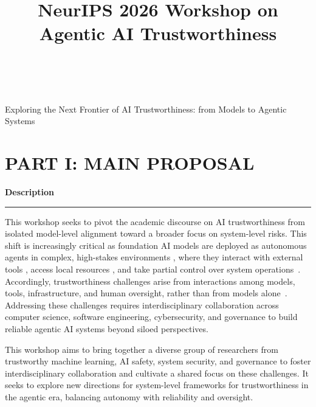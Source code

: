 \documentclass{article}
\title{\large NeurIPS 2026 Workshop on Agentic AI Trustworthiness\\
\large \textit{\mdseries{Sydney, Australia 6-12 December 2026}}\large\normalfont~\raisebox{-0.1em}{[\ding{43}~\href{https://a5507203.github.io/neurips-agentic-ai-workshop/}{\hl{website}}]}}
\author{}
\date{}
\newcommand{\sectiontitle}[1]{\noindent\textbf{\textcolor{neuripsblue}{#1}}\vspace{0.1cm}\hrule\vspace{0.2cm}}
\begin{document}
\maketitle
\vspace{-7em}
\begin{advertisement}
Exploring the Next Frontier of AI Trustworthiness: from Models to Agentic Systems
\end{advertisement}

\section*{\textcolor{neuripsblue}{\large PART I: MAIN PROPOSAL}}
\vspace{-7pt}
\sectiontitle{Description}
\vspace{-2pt}
This workshop seeks to pivot the academic discourse on AI trustworthiness from isolated model-level alignment toward a broader focus on system-level risks. This shift is increasingly critical as foundation AI models are deployed as autonomous agents in complex, high-stakes environments \cite{anthropic_claudecode_2025, openai_codex_system}, where they interact with external tools \cite{schick2023toolformer}, access local resources \cite{yang2024sweagent}, and take partial control over system operations~\cite{li2026les}. Accordingly, trustworthiness challenges arise from interactions among models, tools, infrastructure, and human oversight, rather than from models alone~\cite{deng2024aiagents,kim2026attackdefense}. Addressing these challenges requires interdisciplinary collaboration across computer science, software engineering, cybersecurity, and governance to build reliable agentic AI systems beyond siloed perspectives.


This workshop aims to bring together a diverse group of researchers from trustworthy machine learning, AI safety, system security, and governance to foster interdisciplinary collaboration and cultivate a shared focus on these challenges. It seeks to explore new directions for system-level frameworks for trustworthiness in the agentic era, balancing autonomy with reliability and oversight.
\end{document}
